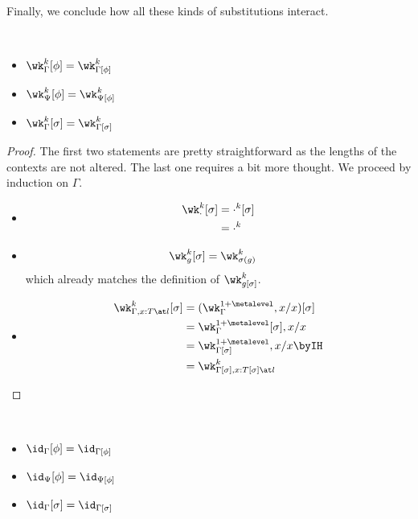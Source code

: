 Finally, we conclude how all these kinds of substitutions interact.
\begin{lemma} $ $
  \begin{itemize}
  \item $\wk^k_\Gamma[\phi] = \wk^k_{\Gamma[\phi]}$
  \item $\wk^k_\Psi[\phi] = \wk^k_{\Psi[\phi]}$
  \item $\wk^k_\Gamma[\sigma] = \wk^k_{\Gamma[\sigma]}$
  \end{itemize}  
\end{lemma}
\begin{proof}
  The first two statements are pretty straightforward as the lengths of the contexts
  are not altered. %
  The last one requires a bit more thought. %
  We proceed by induction on $\Gamma$.
  \begin{itemize}[label=Case]
  \item
    \begin{align*}
      \wk^k_\cdot[\sigma]
      &= \cdot^k[\sigma] \\
      &= \cdot^k
    \end{align*}
  \item
    \begin{align*}
      \wk^k_g[\sigma]
      &= \wk^k_{\sigma(g)}
    \end{align*}
    which already matches the definition of $\wk^k_{g[\sigma]}$.
  \item
    \begin{align*}
      \wk^k_{\Gamma,x: T \at l}[\sigma]
      &= (\wk^{1 + \metalevel}_{\Gamma}, x/x)[\sigma] \\
      &= \wk^{1 + \metalevel}_{\Gamma}[\sigma], x/x \\
      &= \wk^{1 + \metalevel}_{\Gamma[\sigma]}, x/x
        \byIH \\
      &= \wk^{k}_{\Gamma[\sigma], x : T[\sigma] \at l}
    \end{align*}
  \end{itemize}
\end{proof}
\begin{corollary} $ $
  \begin{itemize}
  \item $\id_\Gamma[\phi] = \id_{\Gamma[\phi]}$
  \item $\id_\Psi[\phi] = \id_{\Psi[\phi]}$
  \item $\id_\Gamma[\sigma] = \id_{\Gamma[\sigma]}$
  \end{itemize}
\end{corollary}
